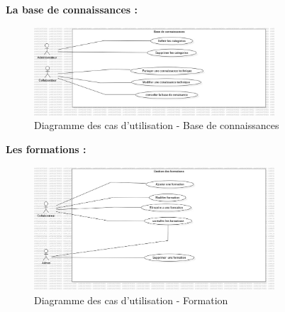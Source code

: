 \documentclass{article}
\begin{document}
                \FloatBarrier
                
                \textbf{La base de connaissances :}
                \begin{figure}[h!]
                    \centering
                    \includegraphics[width=0.8\textwidth]{assets/diagrammes/jpg/Model3!UseCaseDoc_2.jpg}
                    \caption{Diagramme des cas d'utilisation - Base de connaissances}
                \end{figure}
                
                \FloatBarrier
                
                \textbf{Les formations :}
                \begin{figure}[h!]
                    \centering
                    \includegraphics[width=0.8\textwidth]{assets/diagrammes/jpg/Model4!UseCaseFormation_3.jpg}
                    \caption{Diagramme des cas d'utilisation - Formation}
                \end{figure}
                
                \FloatBarrier
                
\end{document}
